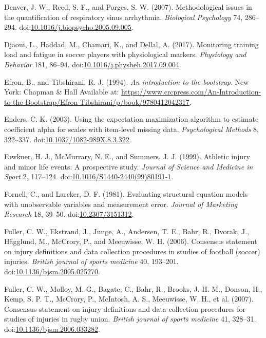 \documentclass[
  english,
  man]{apa6}
\newlength{\cslhangindent}
\newenvironment{cslreferences}%
  {\setlength{\parindent}{0pt}%
  \everypar{\setlength{\hangindent}{\cslhangindent}}\ignorespaces}%
  {\par}
\begin{document}
\begin{cslreferences}
\leavevmode\hypertarget{ref-Denver2007}{}%
Denver, J. W., Reed, S. F., and Porges, S. W. (2007). Methodological issues in the quantification of respiratory sinus arrhythmia. \emph{Biological Psychology} 74, 286--294. doi:\href{https://doi.org/10.1016/j.biopsycho.2005.09.005}{10.1016/j.biopsycho.2005.09.005}.

\leavevmode\hypertarget{ref-Djaoui2017}{}%
Djaoui, L., Haddad, M., Chamari, K., and Dellal, A. (2017). Monitoring training load and fatigue in soccer players with physiological markers. \emph{Physiology and Behavior} 181, 86--94. doi:\href{https://doi.org/10.1016/j.physbeh.2017.09.004}{10.1016/j.physbeh.2017.09.004}.

\leavevmode\hypertarget{ref-Efron1993}{}%
Efron, B., and Tibshirani, R. J. (1994). \emph{An introduction to the bootstrap}. New York: Chapman \& Hall Available at: \url{https://www.crcpress.com/An-Introduction-to-the-Bootstrap/Efron-Tibshirani/p/book/9780412042317}.

\leavevmode\hypertarget{ref-Enders2003}{}%
Enders, C. K. (2003). Using the expectation maximization algorithm to estimate coefficient alpha for scales with item-level missing data. \emph{Psychological Methods} 8, 322--337. doi:\href{https://doi.org/10.1037/1082-989X.8.3.322}{10.1037/1082-989X.8.3.322}.

\leavevmode\hypertarget{ref-Fawkner1999}{}%
Fawkner, H. J., McMurrary, N. E., and Summers, J. J. (1999). Athletic injury and minor life events: A prospective study. \emph{Journal of Science and Medicine in Sport} 2, 117--124. doi:\href{https://doi.org/10.1016/S1440-2440(99)80191-1}{10.1016/S1440-2440(99)80191-1}.

\leavevmode\hypertarget{ref-Fornell1981}{}%
Fornell, C., and Larcker, D. F. (1981). Evaluating structural equation models with unobservable variables and measurement error. \emph{Journal of Marketing Research} 18, 39--50. doi:\href{https://doi.org/10.2307/3151312}{10.2307/3151312}.

\leavevmode\hypertarget{ref-Fuller2006}{}%
Fuller, C. W., Ekstrand, J., Junge, A., Andersen, T. E., Bahr, R., Dvorak, J., Hägglund, M., McCrory, P., and Meeuwisse, W. H. (2006). Consensus statement on injury definitions and data collection procedures in studies of football (soccer) injuries. \emph{British journal of sports medicine} 40, 193--201. doi:\href{https://doi.org/10.1136/bjsm.2005.025270}{10.1136/bjsm.2005.025270}.

\leavevmode\hypertarget{ref-Fuller2007b}{}%
Fuller, C. W., Molloy, M. G., Bagate, C., Bahr, R., Brooks, J. H. M., Donson, H., Kemp, S. P. T., McCrory, P., McIntosh, A. S., Meeuwisse, W. H., et al. (2007). Consensus statement on injury definitions and data collection procedures for studies of injuries in rugby union. \emph{British journal of sports medicine} 41, 328--31. doi:\href{https://doi.org/10.1136/bjsm.2006.033282}{10.1136/bjsm.2006.033282}.


\end{cslreferences}
\end{document}
